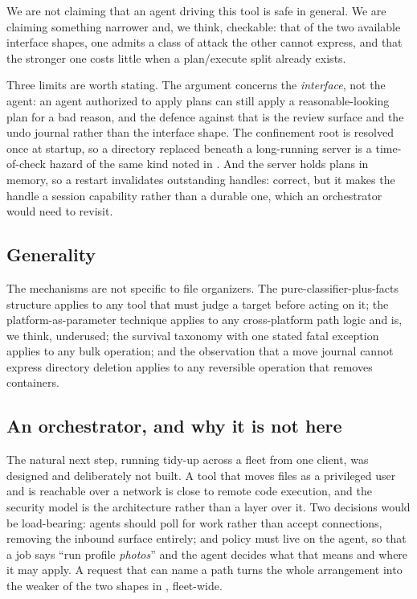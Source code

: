 \documentclass[11pt,a4paper]{article}
\begin{document}
We are not claiming that an agent driving this tool is safe in general. We are
claiming something narrower and, we think, checkable: that of the two available
interface shapes, one admits a class of attack the other cannot express, and
that the stronger one costs little when a plan/execute split already exists.

Three limits are worth stating. The argument concerns the \emph{interface}, not
the agent: an agent authorized to apply plans can still apply a reasonable-looking
plan for a bad reason, and the defence against that is the review surface and
the undo journal rather than the interface shape. The confinement root is
resolved once at startup, so a directory replaced beneath a long-running server
is a time-of-check hazard of the same kind noted in .
And the server holds plans in memory, so a restart invalidates outstanding
handles: correct, but it makes the handle a session capability rather than a
durable one, which an orchestrator would need to revisit.

\subsection{Generality}

The mechanisms are not specific to file organizers. The pure-classifier-plus-facts
structure applies to any tool that must judge a target before acting on it; the
platform-as-parameter technique applies to any cross-platform path logic and is, we
think, underused; the survival taxonomy with one stated fatal exception applies to any
bulk operation; and the observation that a move journal cannot express directory
deletion applies to any reversible operation that removes containers.

\subsection{An orchestrator, and why it is not here}

The natural next step, running tidy-up across a fleet from one client, was
designed and deliberately not built. A tool that moves files as a privileged
user and is reachable over a network is close to remote code execution, and the
security model is the architecture rather than a layer over it. Two decisions
would be load-bearing: agents should poll for work rather than accept
connections, removing the inbound surface entirely; and policy must live on the
agent, so that a job says \enquote{run profile \emph{photos}} and the agent
decides what that means and where it may apply. A request that can name a path
turns the whole arrangement into the weaker of the two shapes in
, fleet-wide.
\end{document}
